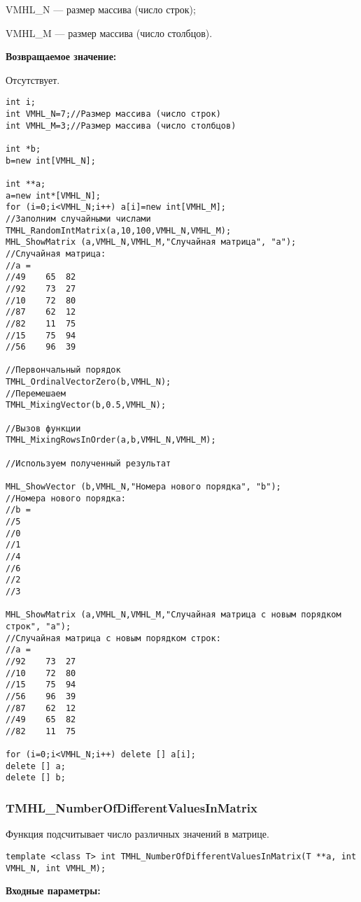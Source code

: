 \documentclass[a4paper,12pt]{article}
\begin{document}
VMHL\_N --- размер массива (число строк);
 
VMHL\_M --- размер массива (число столбцов).

\textbf{Возвращаемое значение:}

Отсутствует.


\begin{lstlisting}[label=code_use_TMHL_MixingRowsInOrder,caption=Пример использования]
int i;
int VMHL_N=7;//Размер массива (число строк)
int VMHL_M=3;//Размер массива (число столбцов)

int *b;
b=new int[VMHL_N];

int **a;
a=new int*[VMHL_N];
for (i=0;i<VMHL_N;i++) a[i]=new int[VMHL_M];
//Заполним случайными числами
TMHL_RandomIntMatrix(a,10,100,VMHL_N,VMHL_M);
MHL_ShowMatrix (a,VMHL_N,VMHL_M,"Случайная матрица", "a");
//Случайная матрица:
//a =
//49	65	82
//92	73	27
//10	72	80
//87	62	12
//82	11	75
//15	75	94
//56	96	39

//Первончальный порядок
TMHL_OrdinalVectorZero(b,VMHL_N);
//Перемешаем
TMHL_MixingVector(b,0.5,VMHL_N);

//Вызов функции
TMHL_MixingRowsInOrder(a,b,VMHL_N,VMHL_M);

//Используем полученный результат

MHL_ShowVector (b,VMHL_N,"Номера нового порядка", "b");
//Номера нового порядка:
//b =
//5
//0
//1
//4
//6
//2
//3

MHL_ShowMatrix (a,VMHL_N,VMHL_M,"Случайная матрица с новым порядком строк", "a");
//Случайная матрица с новым порядком строк:
//a =
//92	73	27
//10	72	80
//15	75	94
//56	96	39
//87	62	12
//49	65	82
//82	11	75

for (i=0;i<VMHL_N;i++) delete [] a[i];
delete [] a;
delete [] b;
\end{lstlisting}

\subsubsection{TMHL\_NumberOfDifferentValuesInMatrix}\label{TMHL_NumberOfDifferentValuesInMatrix}

Функция подсчитывает число различных значений в матрице.


\begin{lstlisting}[label=code_syntax_TMHL_NumberOfDifferentValuesInMatrix,caption=Синтаксис]
template <class T> int TMHL_NumberOfDifferentValuesInMatrix(T **a, int VMHL_N, int VMHL_M);
\end{lstlisting}

\textbf{Входные параметры:}  
 
\end{document}
